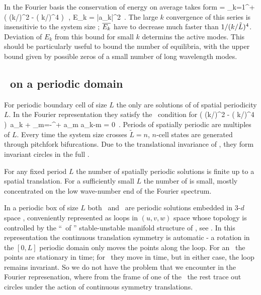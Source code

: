 In the Fourier basis  the conservation of energy on average
takes form
 = \sum_{k=1}^{+\infty} ( (k/\tildeL)^2 - ( k/\tildeL)^4 )\, 
\,,\qquad 
E_k =  |a_k|^2
\,.
The large $k$ convergence of this series is insensitivie to the
system size \tildeL; $\overline{E_k}$ have to decrease much faster than 
$1/( k/\tilde{L})^4$.
Deviation of $E_k$ from this bound for small $k$ determins the active modes.
This should be particularly useful to bound the number of equilibria, with
the upper bound given by possible zeros of a small number 
of long wavelength modes.
%

\subsection{\Eqva\ on a periodic domain}

For periodic boundary cell of size 
$L$ the only {\eqva}  are
solutions of  of spatial periodicity $L$.
In the Fourier representation they satisfy 
the \eqv\ condition for 
\beq
( (k/\tildeL)^2 - ( k/\tildeL)^4 )\, a_k 
    +   \sum_{m=-\infty}^{+\infty} a_m a_{k-m}
  = 0
\,.
\label{eq:stfks}
\eeq 
Periods of spatially periodic {\eqva} are multiples of $L$.
Every time the system size crosses  $\tilde{L}=n$,
$n$-cell states
are generated through pitchfork bifurcations. 
Due to the translational invariance of {\KSe},
they form invariant circles
in the full \statesp.

For any fixed period $L$ the number 
of spatially periodic solutions is finite up to a spatial translation.
For a sufficiently small $L$ 
the number of {\eqva} is small,
mostly
concentrated on the low wave-number end of the Fourier spectrum.

In a periodic box of size $L$
both \eqva\ and \reqva\ are  periodic solutions 
embedded in 3-$d$ space , 
conveniently represented as loops in 
$(u,v,w)$ space whose topology is controlled by the
``\eqva\ of \eqva'' stable-unstable manifold structure of
, see .
In this representation the continuous translation symmetry
is automatic - a rotation in the $[0,L]$ periodic domain only
moves the points along the loop. For an \eqv\ the points
are stationary in time; for \reqv\ they move in time, but in
either case, the loop remains invariant.
So we do not have the problem that we encounter in the Fourier 
represenation, where from the frame of one of the \eqva\
the rest trace out circles under the action of continuous symmetry 
translations.


